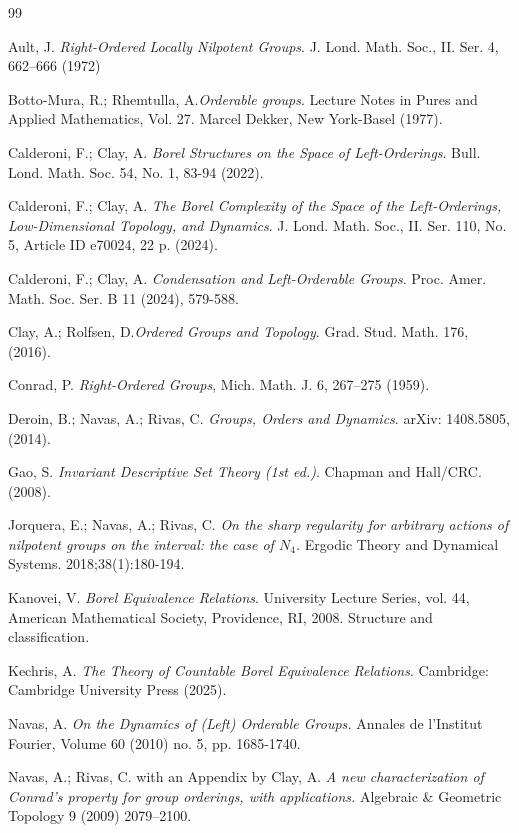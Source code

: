 \documentclass[12pt]{article}
\theoremstyle{definition}
\begin{document}
\begin{thebibliography}{99}

Ault, J. {\it Right-Ordered Locally Nilpotent Groups}. J. Lond. Math. Soc., II. Ser. 4, 662--666 (1972)

Botto-Mura, R.; Rhemtulla, A.{\it Orderable groups}. Lecture Notes in Pures and Applied Mathematics, Vol. 27. Marcel Dekker, New York-Basel (1977). 

Calderoni, F.; Clay, A. {\it Borel Structures on the Space of Left-Orderings}. Bull. Lond. Math. Soc. 54, No. 1, 83-94 (2022).

Calderoni, F.; Clay, A. {\it The Borel Complexity of the Space of the Left-Orderings, Low-Dimensional Topology, and Dynamics}. J. Lond. Math. Soc., II. Ser. 110, No. 5, Article ID e70024, 22 p. (2024).

Calderoni, F.; Clay, A. {\it Condensation and Left-Orderable Groups}. Proc. Amer. Math. Soc. Ser. B 11 (2024), 579-588.

Clay, A.; Rolfsen, D.{\it Ordered Groups and Topology}. Grad. Stud. Math. 176, (2016).

Conrad, P. {\it Right-Ordered Groups}, Mich. Math. J. 6, 267--275 (1959).

Deroin, B.; Navas, A.; Rivas, C. {\it Groups, Orders and Dynamics}. arXiv: 1408.5805, (2014).

Gao, S. {\it Invariant Descriptive Set Theory (1st ed.)}. Chapman and Hall/CRC. (2008). 

Jorquera, E.; Navas, A.; Rivas, C. {\it On the sharp regularity for arbitrary actions of nilpotent groups on the interval: the case of $N_{4}$.} Ergodic Theory and Dynamical Systems. 2018;38(1):180-194.

Kanovei, V. {\it Borel Equivalence Relations}. University Lecture Series, vol. 44, American Mathematical Society, Providence, RI, 2008. Structure and classification.

Kechris, A. {\it The Theory of Countable Borel Equivalence Relations}. Cambridge: Cambridge University Press (2025).

Navas, A. {\it On the Dynamics of (Left) Orderable Groups.} Annales de l'Institut Fourier, Volume 60 (2010) no. 5, pp. 1685-1740.

Navas, A.; Rivas, C. with an Appendix by Clay, A. {\it 
A new characterization of Conrad's property for group orderings, with applications.} 
Algebraic \& Geometric Topology 9 (2009) 2079–2100.


\end{thebibliography}
\end{document}
